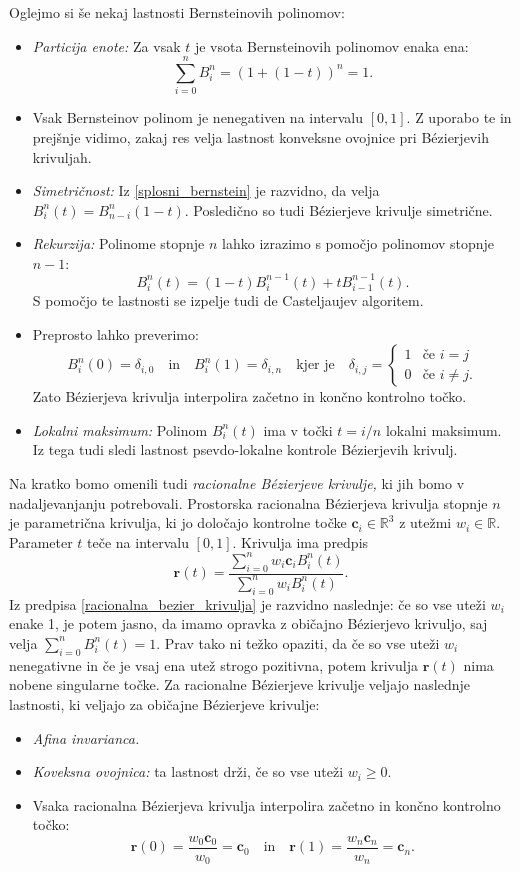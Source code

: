 \documentclass[12pt,a4paper,twoside]{article}
\theoremstyle{definition} %
\theoremstyle{plain} %
\theoremstyle{primerstyle}
\numberwithin{equation}{section}  %
\newcommand{\R}{\mathbb R}
\newcommand{\cV}{\mathbf{c}}
\newcommand{\rV}{\mathbf{r}}
\begin{document}
Oglejmo si še nekaj lastnosti Bernsteinovih polinomov:
\begin{itemize}
	\item \emph{Particija enote:} Za vsak $t$ je vsota Bernsteinovih polinomov enaka ena:
	$$\sum_{i=0}^nB_i^n=(1+(1-t))^n=1.$$
	\item Vsak Bernsteinov polinom je nenegativen na intervalu $[0,1].$ Z uporabo te in prejšnje vidimo, zakaj res velja lastnost konveksne ovojnice pri Bézierjevih krivuljah.
	\item \emph{Simetričnost:} Iz \eqref{splosni_bernstein} je razvidno, da velja $B_i^n(t)=B_{n-i}^n(1-t).$ Posledično so tudi Bézierjeve krivulje simetrične.
	\item \emph{Rekurzija:} Polinome stopnje $n$ lahko izrazimo s pomočjo polinomov stopnje $n-1:$
	$$B_i^n(t)=(1-t)B_i^{n-1}(t)+tB_{i-1}^{n-1}(t).$$
	S pomočjo te lastnosti se izpelje tudi de Casteljaujev algoritem.
	\item Preprosto lahko preverimo:
	$$B_i^n(0)=\delta_{i,0}\quad\text{in}\quad B_i^n(1)=\delta_{i,n}\quad\text{kjer je}\quad \delta_{i,j}=\begin{cases}
										   		1 & \text{če } i=j\\
										   		0 & \text{če } i\neq j.
										   \end{cases}$$
	Zato Bézierjeva krivulja interpolira začetno in končno kontrolno točko.
	\item \emph{Lokalni maksimum:} Polinom $B_i^n(t)$ ima v točki $t=i/n$ lokalni maksimum. Iz tega tudi sledi lastnost psevdo-lokalne kontrole Bézierjevih krivulj.
\end{itemize}

Na kratko bomo omenili tudi \emph{racionalne Bézierjeve krivulje,} ki jih bomo v nadaljevanjanju potrebovali. Prostorska racionalna Bézierjeva krivulja stopnje $n$ je parametrična krivulja, ki jo določajo kontrolne točke $\cV_i\in\R^3$ z utežmi $w_i\in\R.$ Parameter $t$ teče na intervalu $[0,1].$ Krivulja ima predpis
\begin{equation}
	\label{racionalna_bezier_krivulja}
	\rV(t)=\frac{\sum_{i=0}^nw_i\cV_iB_i^n(t)}{\sum_{i=0}^nw_iB_i^n(t)}.
\end{equation}
Iz predpisa \eqref{racionalna_bezier_krivulja} je razvidno naslednje: če so vse uteži $w_i$ enake 1, je potem jasno, da imamo opravka z običajno Bézierjevo krivuljo, saj velja $\sum_{i=0}^nB_i^n(t)=1.$ Prav tako ni težko opaziti, da če so vse uteži $w_i$ nenegativne in če je vsaj ena utež strogo pozitivna, potem krivulja $\rV(t)$ nima nobene singularne točke. Za racionalne Bézierjeve krivulje veljajo naslednje lastnosti, ki veljajo za običajne Bézierjeve krivulje:
\begin{itemize}
	\item \emph{Afina invarianca.}
	\item \emph{Koveksna ovojnica:} ta lastnost drži, če so vse uteži $w_i\geq0.$
	\item Vsaka racionalna Bézierjeva krivulja interpolira začetno in končno kontrolno točko: $$\rV(0)=\frac{w_0\cV_0}{w_0}=\cV_0\quad\text{in}\quad\rV(1)=\frac{w_n\cV_n}{w_n}=\cV_n.$$
\end{itemize}
\end{document}
